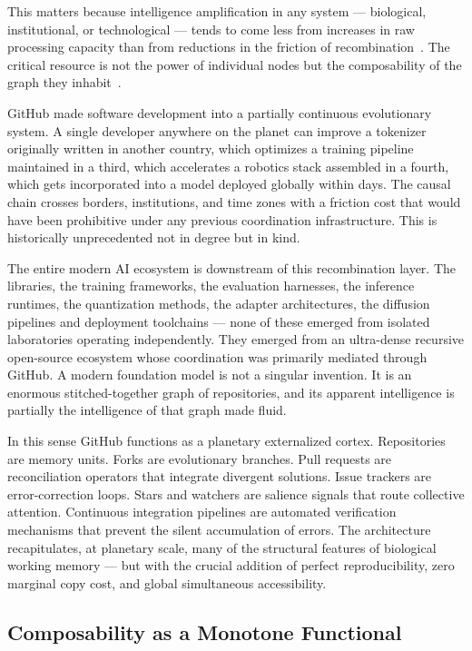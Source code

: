 \documentclass[11pt]{article}
\begin{document}
This matters because intelligence amplification in any system --- biological,
institutional, or technological --- tends to come less from increases in raw
processing capacity than from reductions in the friction of
recombination~\cite{simon1962,wiener1948}. The critical resource is not the
power of individual nodes but the composability of the graph they
inhabit~\cite{barabasi2002}.

GitHub made software development into a partially continuous evolutionary
system. A single developer anywhere on the planet can improve a tokenizer
originally written in another country, which optimizes a training pipeline
maintained in a third, which accelerates a robotics stack assembled in a fourth,
which gets incorporated into a model deployed globally within days. The causal
chain crosses borders, institutions, and time zones with a friction cost that
would have been prohibitive under any previous coordination infrastructure.
This is historically unprecedented not in degree but in kind.

The entire modern AI ecosystem is downstream of this recombination layer. The
libraries, the training frameworks, the evaluation harnesses, the inference
runtimes, the quantization methods, the adapter architectures, the diffusion
pipelines and deployment toolchains --- none of these emerged from isolated
laboratories operating independently. They emerged from an ultra-dense recursive
open-source ecosystem whose coordination was primarily mediated through GitHub.
A modern foundation model is not a singular invention. It is an enormous
stitched-together graph of repositories, and its apparent intelligence is
partially the intelligence of that graph made fluid.

In this sense GitHub functions as a planetary externalized cortex. Repositories
are memory units. Forks are evolutionary branches. Pull requests are
reconciliation operators that integrate divergent solutions. Issue trackers are
error-correction loops. Stars and watchers are salience signals that route
collective attention. Continuous integration pipelines are automated verification
mechanisms that prevent the silent accumulation of errors. The architecture
recapitulates, at planetary scale, many of the structural features of biological
working memory --- but with the crucial addition of perfect reproducibility, zero
marginal copy cost, and global simultaneous accessibility.

\subsection*{Composability as a Monotone Functional}
\end{document}
